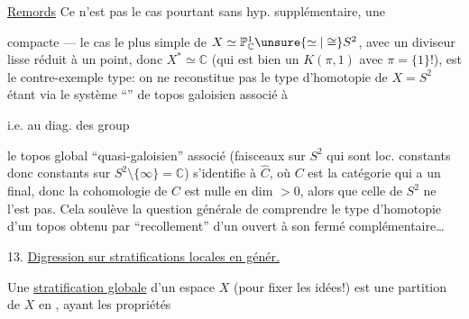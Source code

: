 \uline{Remords} Ce n'est pas le cas pourtant sans hyp. supplémentaire,  une 



compacte --- le cas le plus simple de $X\simeq\mathbb P^1_{\mathbb C}\unsure{\simeq|\cong}S^2$, avec un diviseur lisse réduit à un point, donc $X^{*}\simeq\mathbb C$ (qui est bien un $K(\pi,1)$ avec $\pi=\{1\}$!), est le contre-exemple type: on ne reconstitue pas le type d'homotopie de $X=S^2$   étant   via le système ``'' de topos galoisien associé à


i.e. au diag.
des group

 le topos global ``quasi-galoisien'' associé (faisceaux sur $S^2$ qui sont loc. constants donc constants sur $S^2\setminus\{\infty\}=\mathbb C$) s'identifie à $\widehat C$, où $C$ est la catégorie
\diagram{\begin{tikzcd}[ampersand replacement=\&]\bullet\arrow[r]\&\bullet\end{tikzcd}}
qui a un  final, donc la cohomologie de $\widehat C$ est nulle en dim $>0$, alors que celle de $S^2$ ne l'est pas. Cela soulève la question générale de comprendre le type d'homotopie d'un topos obtenu par ``recollement'' d'un ouvert à son fermé complémentaire\ldots



13. \uline{Digression sur stratifications locales en génér.}

Une \uline{stratification globale} d'un espace  $X$ (pour fixer les idées!) est une partition de $X$ en ,  ayant les propriétés


